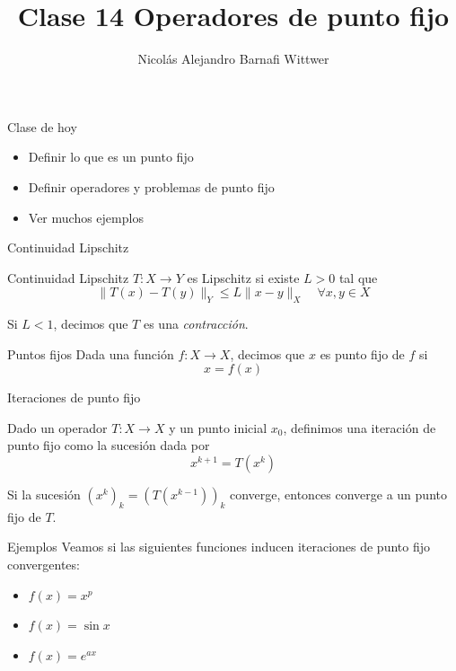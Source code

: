 \documentclass[12pt,aspectratio=169,xcolor=dvipsnames]{beamer}
\title[short title]{Clase 14 Operadores de punto fijo}
\subtitle{}
\author[NA Barnafi] {Nicolás Alejandro Barnafi Wittwer}
\institute[UC|CMM] 
{
    Pontificia Universidad Católica de Chile \\
    Centro de Modelamiento Matemático
}
\date{}
\begin{document}
\begin{frame}
    \maketitle
\end{frame}
\begin{frame}{Clase de hoy}
    \begin{itemize}
        \item Definir lo que es un punto fijo
        \item Definir operadores y problemas de punto fijo
        \item Ver muchos ejemplos
    \end{itemize}
\end{frame}
\begin{frame}{Continuidad Lipschitz}
    \begin{block}{Continuidad Lipschitz}
        $T:X\to Y$ es Lipschitz si existe $L>0$ tal que
        $$ \| T(x) - T(y) \|_Y \leq L\|x-y\|_X \quad \forall x,y \in X$$
    \end{block}
    Si $L<1$, decimos que $T$ es una \emph{contracción}.
\end{frame}
\begin{frame}{Puntos fijos}
    Dada una función $f:X\to X$, decimos que $x$ es punto fijo de $f$ si 
        $$ x = f(x) $$
\end{frame}
\begin{frame}{Iteraciones de punto fijo}
    \begin{block}{}
        Dado un operador $T:X\to X$ y un punto inicial $x_0$, definimos una iteración de punto fijo como la sucesión dada por
            $$ x^{k+1} = T(x^k)$$
    \end{block}
    Si la sucesión $(x^k)_k = (T(x^{k-1}))_k$ converge, entonces converge a un punto fijo de $T$.

    \pause {}
\end{frame}
\begin{frame}{Ejemplos}
    Veamos si las siguientes funciones inducen iteraciones de punto fijo convergentes:
    \begin{itemize}
        \item $f(x)=x^p$
        \item $f(x)=\sin x$
        \item $f(x) = e^{ax}$
    \end{itemize}

\end{frame}
\end{document}
